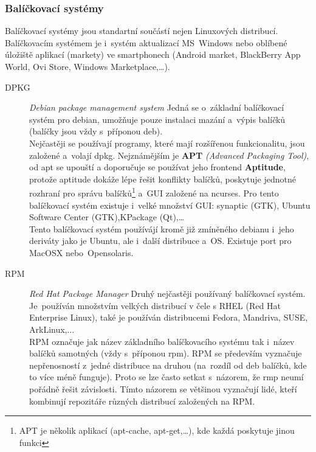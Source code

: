 \documentclass[a4paper,12pt]{article}
\renewcommand{\b}[1]{\textbf{#1}} %
\renewcommand{\it}[1]{\textit{#1}}		%
\begin{document}
\subsubsection{Balíčkovací systémy}
Balíčkovací systémy jsou standartní součástí nejen Linuxových distribucí. Balíčkovacím systémem je i~systém aktualizací MS Windows nebo oblíbené úložiště aplikací (markety) ve smartphonech (Android market, BlackBerry App World, Ovi Store, Windows Marketplace,…).
\begin{description}
 \item[DPKG] \it{Debian package management system} Jedná se o~základní  balíčkovací systém pro debian, umožňuje pouze instalaci mazání a~výpis balíčků (balíčky jsou vždy s~příponou deb).\\

Nejčastěji se používají programy, které mají rozšířenou funkcionalitu, jsou založené a~volají dpkg. Nejznámějším je \b{APT} \it{(Advanced Packaging Tool)}\cite{DPKG}, od apt se upouští a doporučuje se používat jeho frontend \b{Aptitude}, protože aptitude dokáže lépe řešit konflikty balíčků, poskytuje jednotné rozhraní pro správu balíčků\footnote{APT je několik aplikací (apt-cache, apt-get,…), kde každá poskytuje jinou funkci} a~GUI založené na ncurses. Pro tento balíčkovací systém existuje i~velké množství GUI: synaptic (GTK), Ubuntu Software Center (GTK),KPackage (Qt),…\\
Tento balíčkovací systém používájí kromě již zmíněného debianu i~jeho deriváty jako je Ubuntu, ale i~další distribuce a~OS. Existuje port pro MacOSX nebo~Opensolaris\cite{DPKG}.
 \item[RPM] \it{Red Hat Package Manager} Druhý nejčastěji používaný balíčkovací systém. Je~používán množstvím velkých distribucí v čele s RHEL (Red Hat Enterprise Linux), také je používán distribucemi Fedora, Mandriva, SUSE, ArkLinux,...\\

RPM označuje jak název základního balíčkovacího systému tak i~název balíčků samotných (vždy s~příponou rpm). RPM se především vyznačuje nepřenosností z~jedné distribuce na druhou (na~rozdíl od deb balíčků, kde to více méně funguje). Proto se lze často setkat s~názorem, že rmp neumí pořádně řešit závislosti. Tímto názorem se většinou vyznačují lidé, kteří kombinují repozitáře různých distribucí založených na RPM.\\


\end{description}
\end{document}
